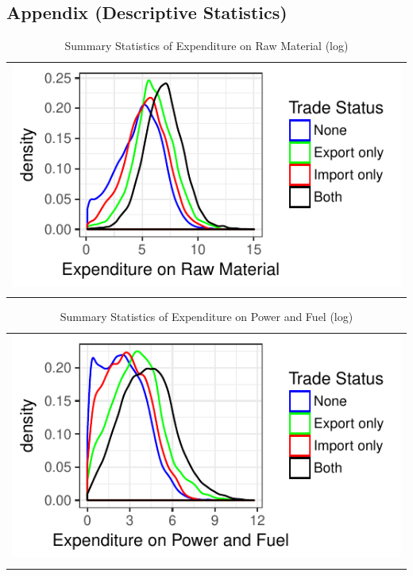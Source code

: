 \documentclass[12pt]{article}
\begin{document}
\subsection{Appendix (Descriptive Statistics)}\label{sec:fuel}
\begin{center}
\begin{table}[H]
\begin{center}
\caption{Summary Statistics of Expenditure on Raw Material (log)}
\label{tab:lrawmat}
\begin{tabular}{c}
 \includegraphics{./PICS/denslrawmat.pdf}   \\ 
   \\  
\end{tabular}
\end{center}
\end{table}
\end{center}
\begin{center}
\begin{table}[H]
\begin{center}
\caption{Summary Statistics of Expenditure on Power and Fuel (log)}
\label{tab:lfuel}
\begin{tabular}{c}
 \includegraphics{./PICS/denslpower.pdf}   \\ 
   \\  
\end{tabular}
\end{center}
\end{table}
\end{center}
\restoregeometry
\end{document}
